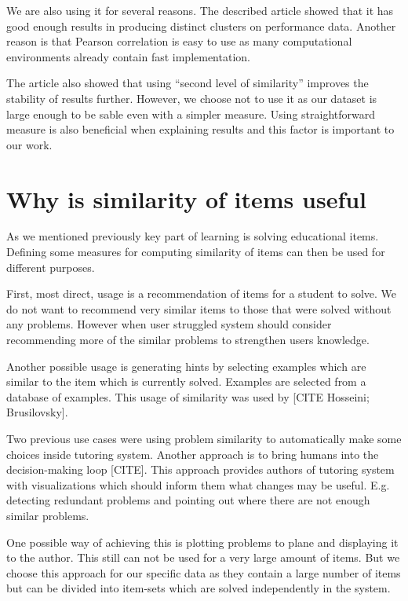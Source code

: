 \documentclass[
  digital, %
  table,   %
  nolof,     %
  nolot,     %
  nocover,
  color
]{fithesis3}
\begin{document}
We are also using it for several reasons. The described article showed that it has good enough results in producing distinct clusters on performance data. Another reason is that Pearson correlation is easy to use as many computational environments already contain fast implementation.

The article also showed that using ``second level of similarity'' improves the stability of results further. However, we choose not to use it as our dataset is large enough to be sable even with a simpler measure. Using straightforward measure is also beneficial when explaining results and this factor is important to our work.

\section{Why is similarity of items useful}\label{why-is-similarity-of-items-useful}


As we mentioned previously key part of learning is solving educational items. Defining some measures for computing similarity of items can then be used for different purposes.

First, most direct, usage is a recommendation of items for a student to solve. We do not want to recommend very similar items to those that were solved without any problems. However when user struggled system should consider recommending more of the similar problems to strengthen users knowledge.

Another possible usage is generating hints by selecting examples which are similar to the item which is currently solved. Examples are selected from a database of examples. This usage of similarity was used by [CITE Hosseini; Brusilovsky].

Two previous use cases were using problem similarity to automatically make some choices inside tutoring system. Another approach is to bring humans into the decision-making loop [CITE]. This approach provides authors of tutoring system with visualizations which should inform them what changes may be useful. E.g. detecting redundant problems and pointing out where there are not enough similar problems.

One possible way of achieving this is plotting problems to plane and displaying it to the author. This still can not be used for a very large amount of items. But we choose this approach for our specific data as they contain a large number of items but can be divided into item-sets which are solved independently in the system.
\end{document}
